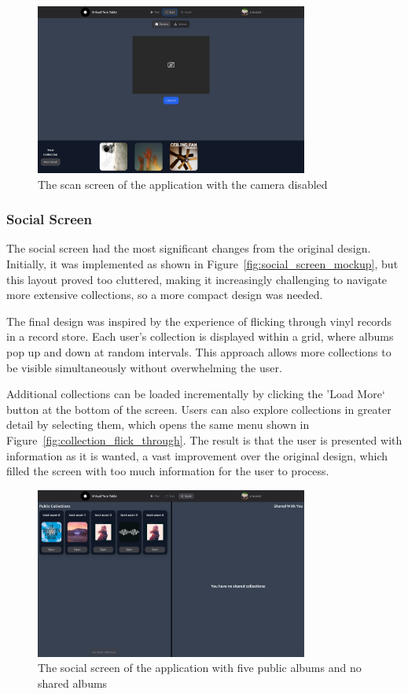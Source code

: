 \begin{figure} [H]
    \centering
    \includegraphics[width=0.8\textwidth]{figures/scan_screen.png}
    \caption{The scan screen of the application with the camera disabled}
    \label{fig:scan_screen}
\end{figure}

\subsubsection{Social Screen}
The social screen had the most significant changes from the original design. Initially, it was implemented as shown in Figure~\ref{fig:social_screen_mockup}, but this layout proved too cluttered, making it increasingly challenging to navigate more extensive collections, so a more compact design was needed.

The final design was inspired by the experience of flicking through vinyl records in a record store. Each user's collection is displayed within a grid, where albums pop up and down at random intervals. This approach allows more collections to be visible simultaneously without overwhelming the user.

Additional collections can be loaded incrementally by clicking the 'Load More` button at the bottom of the screen. Users can also explore collections in greater detail by selecting them, which opens the same menu shown in Figure~\ref{fig:collection_flick_through}. The result is that the user is presented with information as it is wanted, a vast improvement over the original design, which filled the screen with too much information for the user to process.

\begin{figure} [H]
    \centering
    \includegraphics[width=0.8\textwidth]{figures/social_screen.png}
    \caption{The social screen of the application with five public albums and no shared albums}
    \label{fig:social screen}
\end{figure}

